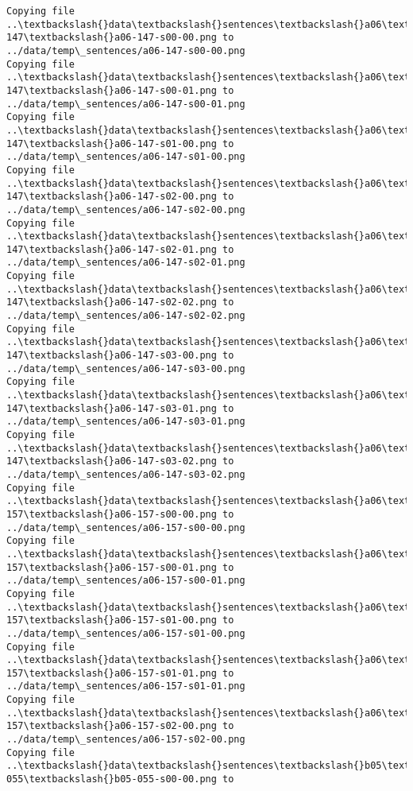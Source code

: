 \documentclass[11pt]{article}
\begin{document}
\begin{Verbatim}[commandchars=\\\{\}]
Copying file ..\textbackslash{}data\textbackslash{}sentences\textbackslash{}a06\textbackslash{}a06-147\textbackslash{}a06-147-s00-00.png to
../data/temp\_sentences/a06-147-s00-00.png
Copying file ..\textbackslash{}data\textbackslash{}sentences\textbackslash{}a06\textbackslash{}a06-147\textbackslash{}a06-147-s00-01.png to
../data/temp\_sentences/a06-147-s00-01.png
Copying file ..\textbackslash{}data\textbackslash{}sentences\textbackslash{}a06\textbackslash{}a06-147\textbackslash{}a06-147-s01-00.png to
../data/temp\_sentences/a06-147-s01-00.png
Copying file ..\textbackslash{}data\textbackslash{}sentences\textbackslash{}a06\textbackslash{}a06-147\textbackslash{}a06-147-s02-00.png to
../data/temp\_sentences/a06-147-s02-00.png
Copying file ..\textbackslash{}data\textbackslash{}sentences\textbackslash{}a06\textbackslash{}a06-147\textbackslash{}a06-147-s02-01.png to
../data/temp\_sentences/a06-147-s02-01.png
Copying file ..\textbackslash{}data\textbackslash{}sentences\textbackslash{}a06\textbackslash{}a06-147\textbackslash{}a06-147-s02-02.png to
../data/temp\_sentences/a06-147-s02-02.png
Copying file ..\textbackslash{}data\textbackslash{}sentences\textbackslash{}a06\textbackslash{}a06-147\textbackslash{}a06-147-s03-00.png to
../data/temp\_sentences/a06-147-s03-00.png
Copying file ..\textbackslash{}data\textbackslash{}sentences\textbackslash{}a06\textbackslash{}a06-147\textbackslash{}a06-147-s03-01.png to
../data/temp\_sentences/a06-147-s03-01.png
Copying file ..\textbackslash{}data\textbackslash{}sentences\textbackslash{}a06\textbackslash{}a06-147\textbackslash{}a06-147-s03-02.png to
../data/temp\_sentences/a06-147-s03-02.png
Copying file ..\textbackslash{}data\textbackslash{}sentences\textbackslash{}a06\textbackslash{}a06-157\textbackslash{}a06-157-s00-00.png to
../data/temp\_sentences/a06-157-s00-00.png
Copying file ..\textbackslash{}data\textbackslash{}sentences\textbackslash{}a06\textbackslash{}a06-157\textbackslash{}a06-157-s00-01.png to
../data/temp\_sentences/a06-157-s00-01.png
Copying file ..\textbackslash{}data\textbackslash{}sentences\textbackslash{}a06\textbackslash{}a06-157\textbackslash{}a06-157-s01-00.png to
../data/temp\_sentences/a06-157-s01-00.png
Copying file ..\textbackslash{}data\textbackslash{}sentences\textbackslash{}a06\textbackslash{}a06-157\textbackslash{}a06-157-s01-01.png to
../data/temp\_sentences/a06-157-s01-01.png
Copying file ..\textbackslash{}data\textbackslash{}sentences\textbackslash{}a06\textbackslash{}a06-157\textbackslash{}a06-157-s02-00.png to
../data/temp\_sentences/a06-157-s02-00.png
Copying file ..\textbackslash{}data\textbackslash{}sentences\textbackslash{}b05\textbackslash{}b05-055\textbackslash{}b05-055-s00-00.png to

\end{Verbatim}
\end{document}
